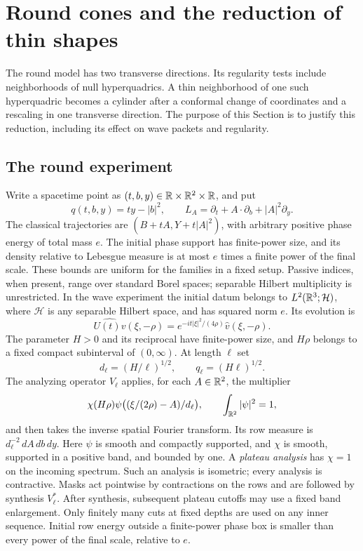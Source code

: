 \section{Round cones and the reduction of thin shapes}\label{sec:round-transfer}

The round model has two transverse directions.  Its regularity tests include
neighborhoods of null hyperquadrics.  A thin neighborhood of one such
hyperquadric becomes a cylinder after a conformal change of coordinates and a
rescaling in one transverse direction.  The purpose of this Section is to
justify this reduction, including its effect on wave packets and regularity.

\subsection{The round experiment}

\begin{definition}\label{rt:model}
Write a spacetime point as $(t,b,y)\in\mathbb R\times\mathbb R^2\times\mathbb R$, and put
\[
 q(t,b,y)=ty-|b|^2,\qquad
 L_A=\partial_t+A\cdot\partial_b+|A|^2\partial_y.
\]
The classical trajectories are
$(B+tA,Y+t|A|^2)$, with arbitrary positive phase energy of total mass $e$.
The initial phase support has finite-power size, and its density relative
to Lebesgue measure is at most $e$ times a finite power of the final scale.
These bounds are uniform for the families in a fixed setup.  Passive
indices, when present, range over standard Borel spaces; separable
Hilbert multiplicity is unrestricted.
In the wave experiment the initial datum belongs to
$L^2(\mathbb R^3;\mathcal H)$, where $\mathcal H$ is any separable Hilbert space,
and has squared norm $e$.  Its evolution is
\[
 \widehat{U(t)v}(\xi,-\rho)
 =e^{-it|\xi|^2/(4\rho)}\widehat v(\xi,-\rho).
\]
The parameter $H>0$ and its reciprocal have finite-power size, and
$H\rho$ belongs to a fixed compact subinterval of $(0,\infty)$.
At length $\ell$ set
\[
 d_\ell=(H/\ell)^{1/2},\qquad q_\ell=(H\ell)^{1/2}.
\]
The analyzing operator $V_\ell$ applies, for each $A\in\mathbb R^2$, the multiplier
\[
 \chi(H\rho)\psi\bigl((\xi/(2\rho)-A)/d_\ell\bigr),
 \qquad \int_{\mathbb R^2}|\psi|^2=1,
\]
and then takes the inverse spatial Fourier transform.  Its row measure is
$d_\ell^{-2}\,dA\,db\,dy$.  Here $\psi$ is smooth and compactly supported,
and $\chi$ is smooth, supported in a positive band, and bounded by one.
A \emph{plateau analysis} has $\chi=1$ on the incoming spectrum.  Such an
analysis is isometric; every analysis is contractive.  Masks act pointwise
by contractions on the rows and are followed by synthesis $V_\ell^*$.
After synthesis, subsequent plateau cutoffs may use a fixed band enlargement.
Only finitely many cuts at fixed depths are used on any inner sequence.
Initial row energy outside a finite-power phase box is smaller than every
power of the final scale, relative to $e$.
\end{definition}

